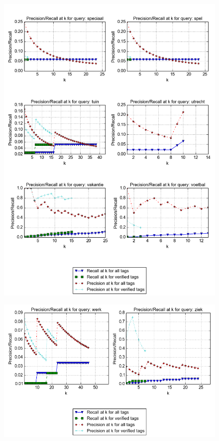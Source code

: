 \begin{figure}[H]
\centering
\includegraphics[width=\textwidth]{appendixd/queries-speciaal}
\end{figure}


\begin{figure}[H]
\centering
\includegraphics[width=\textwidth]{appendixd/queries-werk}
\end{figure}